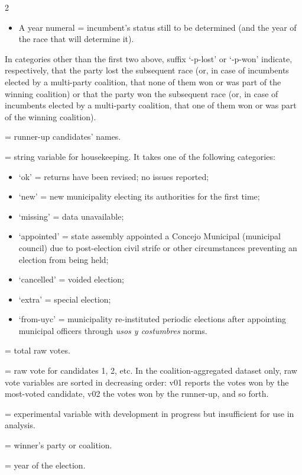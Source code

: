 \documentclass[letter,12pt]{article}
\begin{document}
\begin{singlespace}
\begin{multicols}{2}
\begin{footnotesize}
\begin{description}
\begin{itemize}
  \item A year numeral = incumbent's status still to be determined (and the year of the race that will determine it).
  \end{itemize}
In categories other than the first two above, suffix `-p-lost' or `-p-won' indicate, respectively, that the party lost the subsequent race (or, in case of incumbents elected by a multi-party coalition, that none of them won or was part of the winning coalition) or that the party won the subsequent race (or, in case of incumbents elected by a multi-party coalition, that one of them won or was part of the winning coalition).
\item[runnerup] = runner-up candidates' names.
\item[status] = string variable for housekeeping. It takes one of the following categories:
  \begin{itemize}
  \item `ok' = returns have been revised; no issues reported;
  \item `new' = new municipality electing its authorities for the first time;
  \item `missing' = data unavailable;
  \item `appointed' = state assembly appointed a Concejo Municipal (municipal council) due to post-election civil strife or other circumstances preventing an election from being held;
  \item `cancelled' = voided election;
  \item `extra' = special election;
  \item `from-uyc' = municipality re-instituted periodic elections after appointing municipal officers through \emph{usos y costumbres} norms.
  \end{itemize}
\item[tot] = total raw votes.
\item[v01, v02, ...] = raw vote for candidates 1, 2, etc. In the coalition-aggregated dataset only, raw vote variables are sorted in decreasing order: v01 reports the votes won by the most-voted candidate, v02 the votes won by the runner-up, and so forth.
\item[who] = experimental variable with development in progress but insufficient for use in analysis.
\item[win] = winner's party or coalition.
\item[yr] = year of the election.
\end{description}

\end{footnotesize}

\end{multicols}





\end{singlespace}
\end{document}
